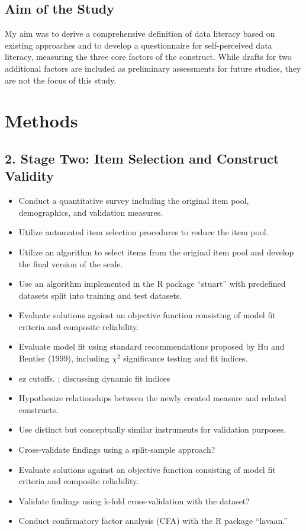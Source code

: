 \documentclass[
  12pt,
  a4paper,
  twoside]{article}
\providecommand{\tightlist}{%
  \setlength{\itemsep}{0pt}\setlength{\parskip}{0pt}}
\begin{document}
\subsection{Aim of the Study}\label{aim-of-the-study}

My aim was to derive a comprehensive definition of data literacy based
on existing approaches and to develop a questionnaire for self-perceived
data literacy, measuring the three core factors of the construct. While
drafts for two additional factors are included as preliminary
assessments for future studies, they are not the focus of this study.

\section{Methods}\label{methods}

\subsection{2. Stage Two: Item Selection and Construct
Validity}\label{stage-two-item-selection-and-construct-validity}

\begin{itemize}
\tightlist
\item
  Conduct a quantitative survey including the original item pool,
  demographics, and validation measures.
\item
  Utilize automated item selection procedures to reduce the item pool.
\item
  Utilize an algorithm to select items from the original item pool and
  develop the final version of the scale.
\item
  Use an algorithm implemented in the R package ``stuart'' with
  predefined datasets split into training and test datasets.
\item
  Evaluate solutions against an objective function consisting of model
  fit criteria and composite reliability.
\item
  Evaluate model fit using standard recommendations proposed by Hu and
  Bentler (1999), including \(\chi^2\) significance testing and fit
  indices.
\item
  ez cutoffs. ; discussing dynamic fit indices
\item
  Hypothesize relationships between the newly created measure and
  related constructs.
\item
  Use distinct but conceptually similar instruments for validation
  purposes.
\item
  Cross-validate findings using a split-sample approach?
\item
  Evaluate solutions against an objective function consisting of model
  fit criteria and composite reliability.
\item
  Validate findings using k-fold cross-validation with the dataset?
\item
  Conduct confirmatory factor analysis (CFA) with the R package
  ``lavaan.''
\end{itemize}
\end{document}
